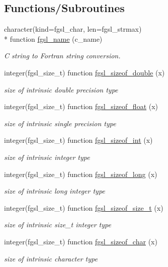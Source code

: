 \subsection*{Functions/\-Subroutines}
\begin{DoxyCompactItemize}
\item 
character(kind=fgsl\-\_\-char, len=fgsl\-\_\-strmax) \\*
function \hyperlink{misc_8finc_a014cd02b3b4d29919fd8e1947a2673d0}{fgsl\-\_\-name} (c\-\_\-name)
\begin{DoxyCompactList}\small\item\em C string to Fortran string conversion. \end{DoxyCompactList}\item 
integer(fgsl\-\_\-size\-\_\-t) function \hyperlink{misc_8finc_a896bd2c97151708c197858a357ea50e2}{fgsl\-\_\-sizeof\-\_\-double} (x)
\begin{DoxyCompactList}\small\item\em size of intrinsic double precision type \end{DoxyCompactList}\item 
integer(fgsl\-\_\-size\-\_\-t) function \hyperlink{misc_8finc_a993f009131d0e6bf9bcdebe827162450}{fgsl\-\_\-sizeof\-\_\-float} (x)
\begin{DoxyCompactList}\small\item\em size of intrinsic single precision type \end{DoxyCompactList}\item 
integer(fgsl\-\_\-size\-\_\-t) function \hyperlink{misc_8finc_abea36929b3d5a33cb24fbca3f52e6aa2}{fgsl\-\_\-sizeof\-\_\-int} (x)
\begin{DoxyCompactList}\small\item\em size of intrinsic integer type \end{DoxyCompactList}\item 
integer(fgsl\-\_\-size\-\_\-t) function \hyperlink{misc_8finc_ac74c9d7b9d14a74b9b32796d620f685f}{fgsl\-\_\-sizeof\-\_\-long} (x)
\begin{DoxyCompactList}\small\item\em size of intrinsic long integer type \end{DoxyCompactList}\item 
integer(fgsl\-\_\-size\-\_\-t) function \hyperlink{misc_8finc_a4befb04b07c33f2dc158a1349971d416}{fgsl\-\_\-sizeof\-\_\-size\-\_\-t} (x)
\begin{DoxyCompactList}\small\item\em size of intrinsic size\-\_\-t integer type \end{DoxyCompactList}\item 
integer(fgsl\-\_\-size\-\_\-t) function \hyperlink{misc_8finc_a703e0d9c10d808494cfa6597f403d8e3}{fgsl\-\_\-sizeof\-\_\-char} (x)
\begin{DoxyCompactList}\small\item\em size of intrinsic character type \end{DoxyCompactList}\end{DoxyCompactItemize}


